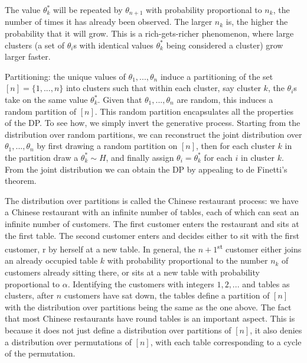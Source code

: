\noindent The value $\theta_{k}^{*}$ will be repeated by $\theta_{n+1}$ with probability proportional to $n_{k}$, the number of times it has already been observed. The larger $n_{k}$ is, the higher the probability that it will grow. This is a rich-gets-richer phenomenon, where large clusters (a set of $\theta_{i}$s with identical values $\theta_{k}^{*}$ being considered a cluster) grow larger faster.

Partitioning: the unique values of $\theta_{1},...,\theta_{n}$ induce a partitioning of the set $[n]=\{1,...,n\}$ into clusters such that within each cluster, say cluster $k$, the $\theta_{i}$s take on the same value $\theta_{k}^{*}$. Given that $\theta_{1},...,\theta_{n}$ are random, this induces a random partition of $[n]$. This random partition encapsulates all the properties of the DP. To see how, we simply invert the generative process. Starting from the distribution over random partitions, we can reconstruct the joint distribution over $\theta_{1},...,\theta_{n}$ by first drawing a random partition on $[n]$, then for each cluster $k$ in the partition draw a $\theta_{k}^{*}\sim H$, and finally assign $\theta_{i}=\theta_{k}^{*}$ for each $i$ in cluster $k$. From the joint distribution we can obtain the DP by appealing to de Finetti's theorem.

The distribution over partitions is called the Chinese restaurant process: we have a Chinese restaurant with an infinite number of tables, each of which can seat an infinite number of customers. The first customer enters the restaurant and sits at the first table. The second customer enters and decides either to sit with the first customer, r by herself at a new table. In general, the $n+1$\textsuperscript{st} customer either joins an already occupied table $k$ with probability proportional to the number $n_{k}$ of customers already sitting there, or sits at a new table with probability proportional to $\alpha$. Identifying the customers with integers $1,2,...$ and tables as clusters, after $n$ customers have sat down, the tables define a partition of $[n]$ with the distribution over partitions being the same as the one above. The fact that most Chinese restaurants have round tables is an important aspect. This is because it does not just define a distribution over partitions of $[n]$, it also denies a distribution over permutations of $[n]$, with each table corresponding to a cycle of the permutation.

